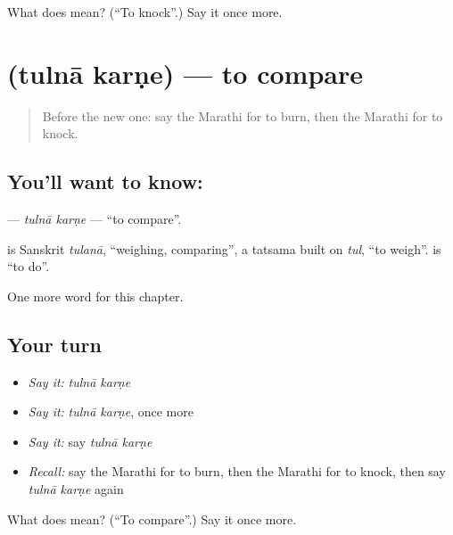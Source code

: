 \begin{tcolorbox}[breakable,colback=teal!4,colframe=teal!35!black,title={Before you move on}]
What does  mean? (\textquotedblleft{}To knock\textquotedblright{}.) Say it once more.
\end{tcolorbox}
\section[\texorpdfstring{\mr{तुलना} \mr{करणे} (tulnā karṇe)}{तुलना करणे (tulnā karṇe)}]{  (tulnā karṇe) — to compare}

\label{lesson:MR-C195-tulna-karne}



\begin{quote}
Before the new one: say the Marathi for to burn, then the Marathi for to knock.
\end{quote}

\subsection*{You'll want to know:  }
\textbf{ } — \emph{tulnā karṇe} — \textquotedblleft{}to compare\textquotedblright{}.

\begin{cousinweb}
\textbf{} is Sanskrit \emph{tulanā}, \textquotedblleft{}weighing, comparing\textquotedblright{}, a tatsama built on \emph{tul}, \textquotedblleft{}to weigh\textquotedblright{}. \textbf{} is \textquotedblleft{}to do\textquotedblright{}.
\end{cousinweb}

\begin{grammarlens}[title={What you've built}]
One more word for this chapter.
\end{grammarlens}

\subsection*{Your turn}
\begin{itemize}
\raggedright
  \item \emph{Say it:} \emph{tulnā karṇe}
  \item \emph{Say it:} \emph{tulnā karṇe}, once more
  \item \emph{Say it:} say \emph{tulnā karṇe}
  \item \emph{Recall:} say the Marathi for to burn, then the Marathi for to knock, then say \emph{tulnā karṇe} again
\end{itemize}

\begin{tcolorbox}[breakable,colback=teal!4,colframe=teal!35!black,title={Before you move on}]
What does   mean? (\textquotedblleft{}To compare\textquotedblright{}.) Say it once more.
\end{tcolorbox}
